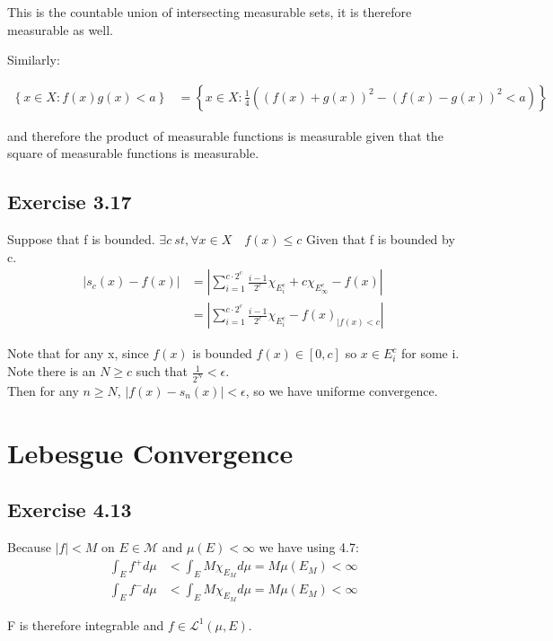 \documentclass[11pt]{article}
\numberwithin{equation}{section}
\theoremstyle{plain}
\theoremstyle{definition}
\newcommand\parens[1]{\left( #1 \right)}
\newcommand\braces[1]{\left\{ #1 \right\}}
\newcommand\abs[1]{\left| #1 \right|}
\newcommand{\1}{\mathbbm 1}
\begin{document}
This is the countable union of intersecting measurable sets, it is therefore measurable as well. 

Similarly: 

\begin{align}
\braces{ x \in X: f(x) g(x) < a} &= \braces{x \in X: \frac{1}{4} \parens{(f(x) + g(x))^2 - (f(x) - g(x))^2 < a}} 
\end{align}

and therefore the product of measurable functions is measurable given that the square of measurable functions is measurable. 
\newpage

\subsection*{Exercise 3.17}

Suppose that f is bounded. $\exists c \ st,\forall x \in X \quad f(x) \leq c$
Given that f is bounded by c.
\begin{align}
\abs{s_c(x) - f(x)} &= \abs{\sum_{i=1}^{c \cdot 2^{c}} \frac{i-1}{2^{c}} \chi_{E_{i}^{c}}+ c \chi_{E_{\infty}^{c}} - f(x)} \\
					&= \abs{\sum_{i=1}^{c \cdot 2^{c}} \frac{i-1}{2^{c}} \chi_{E_{i}^{c}} - f(x)_{|f(x)<c}}
\end{align}


Note that for any x, since $f(x)$ is bounded $f(x) \in [0,c]$ so $x \in E_{i}^{c}$ for some i. Note there is an $N \geq c$ such that $\frac{1}{2^{N}}< \epsilon$. \\
 Then for any $n \geq N$, $\left|f(x)-s_{n}(x)\right|<\epsilon$, so we have uniforme convergence.

 \section*{Lebesgue Convergence}

\subsection*{Exercise 4.13}
Because $|f|<M \text { on } E \in \mathcal{M}$ and $\mu(E)<\infty$ we have using 4.7:
\begin{align}
\int_{E} f^+ d \mu &< \int_{E} M \chi_{E_{M}} d \mu = M \mu (E_M) < \infty \\
\int_{E} f^- d \mu &< \int_{E} M \chi_{E_{M}} d \mu = M \mu (E_M) < \infty
\end{align}

F is therefore integrable and $f \in \mathscr{L}^{1}(\mu, E)$.
\end{document}
